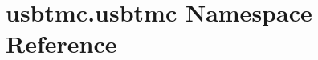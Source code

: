 \hypertarget{namespaceusbtmc_1_1usbtmc}{}\section{usbtmc.\+usbtmc Namespace Reference}
\label{namespaceusbtmc_1_1usbtmc}
